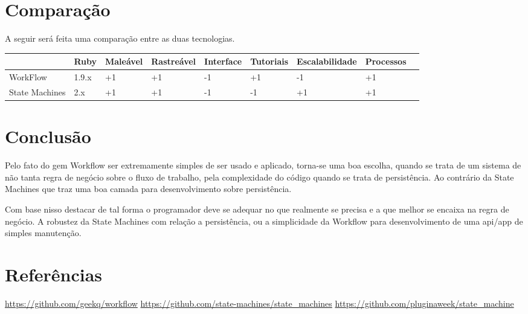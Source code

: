 \documentclass[12pt, letterpaper]{article}
\begin{document}
\section{Comparação}
A seguir será feita uma comparação entre as duas tecnologias.
\begin{center}
\begin{tabular}{|l|l|l|l|l|l|l|l|l|}
\hline
               & \scriptsize{Ruby}  & \scriptsize{Maleável} & \scriptsize{Rastreável} & \scriptsize{Interface} & \scriptsize{Tutoriais} & \scriptsize{Escalabilidade} & \scriptsize{Processos} \\ \hline
\scriptsize{WorkFlow}       & 1.9.x & +1       & +1         & -1        & +1        & -1             & +1        \\ \hline
\scriptsize{State Machines} & 2.x   & +1       & +1         & -1        & -1        & +1             & +1        \\ \hline
\end{tabular}
\end{center}

\newpage
\section{Conclusão}

\par
Pelo fato do gem Workflow ser extremamente simples de ser usado e aplicado, torna-se uma boa escolha, quando se trata de um sistema de não tanta regra de negócio sobre o fluxo de trabalho, pela complexidade do código quando se trata de persistência. Ao contrário da State Machines que traz uma boa camada para desenvolvimento sobre persistência.
\par
Com base nisso destacar de tal forma o programador deve se adequar no que realmente se precisa e a que melhor se encaixa na regra de negócio. A robustez da State Machines com relação a persistência, ou a simplicidade da Workflow para desenvolvimento de uma api/app de simples manutenção.

\newpage
\section{Referências}
\url{https://github.com/geekq/workflow}\break
\url{https://github.com/state-machines/state_machines}\break
\url{https://github.com/pluginaweek/state_machine}


\end{document}
